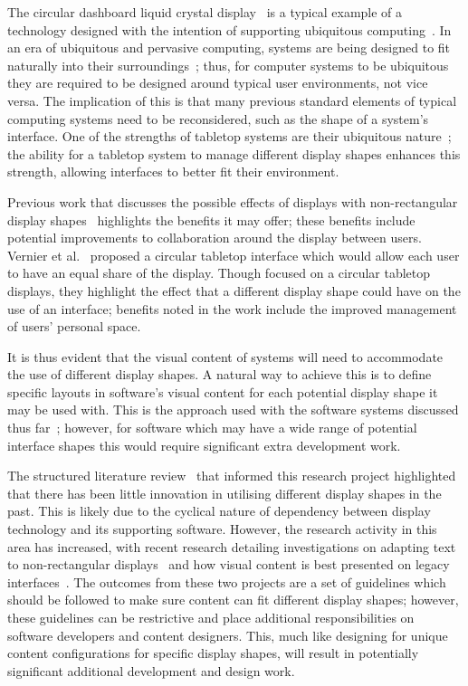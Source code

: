 \documentclass[twocolumn,compsoc]{cvm}
\begin{document}
The circular dashboard liquid crystal display~\cite{Boyd2007} is a typical example of a technology designed with the intention of supporting ubiquitous computing~\cite{Weiser1999}.
In an era of ubiquitous and pervasive computing, systems are being designed to fit naturally into their surroundings~\cite{Greenfield2006}; thus, for computer systems to be ubiquitous they are required to be designed around typical user environments, not vice versa.
The implication of this is that many previous standard elements of typical computing systems need to be reconsidered, such as the shape of a system's interface.
One of the strengths of tabletop systems are their ubiquitous nature~\cite{Smith2012}; the ability for a tabletop system to manage different display shapes enhances this strength, allowing interfaces to better fit their environment.

Previous work that discusses the possible effects of displays with non-rectangular display shapes~\cite{Vernier2002} highlights the benefits it may offer; these benefits include potential improvements to collaboration around the display between users.
Vernier et al.~\cite{Vernier2002} proposed a circular tabletop interface which would allow each user to have an equal share of the display.
Though focused on a circular tabletop displays, they highlight the effect that a different display shape could have on the use of an interface; benefits noted in the work include the improved management of users' personal space.

It is thus evident that the visual content of systems will need to accommodate the use of different display shapes.
A natural way to achieve this is to define specific layouts in software's visual content for each potential display shape it may be used with.
This is the approach used with the software systems discussed thus far~\cite{Hansen2009,Shen2004}; however, for software which may have a wide range of potential interface shapes this would require significant extra development work.

The structured literature review~\cite{Kitchenham2004} that informed this research project highlighted that there has been little innovation in utilising different display shapes in the past.
This is likely due to the cyclical nature of dependency between display technology and its supporting software.
However, the research activity in this area has increased, with recent research detailing investigations on adapting text to non-rectangular displays~\cite{Serrano2016} and how visual content is best presented on legacy interfaces~\cite{Serrano2017}.
The outcomes from these two projects are a set of guidelines which should be followed to make sure content can fit different display shapes; however, these guidelines can be restrictive and  place additional responsibilities on software developers and content designers.
This, much like designing for unique content configurations for specific display shapes, will result in potentially significant additional development and design work.
\end{document}
